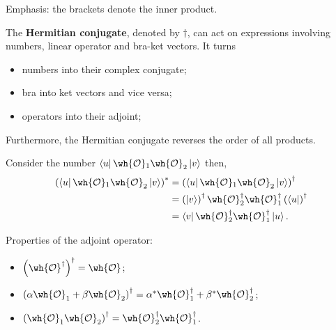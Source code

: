 \documentclass[12pt, a4paper]{article}
\begin{document}
\begin{mdnote}
    Emphasis: the brackets denote the inner product.
\end{mdnote}

\begin{mdthm}
    The \textbf{Hermitian conjugate}, denoted by \(\dagger\), can act on expressions involving numbers, linear operator and bra-ket vectors. It turns 
    \begin{itemize}
        \item numbers into their complex conjugate;
        \item bra into ket vectors and vice versa;
        \item operators into their adjoint;
    \end{itemize}
    Furthermore, the Hermitian conjugate reverses the order of all products.
\end{mdthm}

\begin{mdexample}
    Consider the number \(\bra{u} \wh{\mathcal{O}}_1 \wh{\mathcal{O}}_2 \ket{v}\) then,
    \[\begin{aligned}
        \left( \bra{u} \wh{\mathcal{O}}_1 \wh{\mathcal{O}}_2 \ket{v} \right)^* &= \left( \bra{u} \wh{\mathcal{O}}_1 \wh{\mathcal{O}}_2 \ket{v} \right)^{\dagger} \\
        &= \left( \ket{v} \right)^{\dagger} \wh{\mathcal{O}}_2^{\dagger} \wh{\mathcal{O}}_1^{\dagger} \left( \bra{u} \right)^{\dagger} \\
        &= \bra{v} \wh{\mathcal{O}}_2^{\dagger} \wh{\mathcal{O}}_1^{\dagger} \ket{u}.
    \end{aligned}\]
\end{mdexample}

\begin{mdprop}
    Properties of the adjoint operator:
    \begin{itemize}
        \item \(\left( {\wh{\mathcal{O}}}^{\dagger} \right)^{\dagger} = \wh{\mathcal{O}}\);
        \item \(\left( \alpha\wh{\mathcal{O}}_1 +\beta \wh{\mathcal{O}}_2  \right)^{\dagger} = \alpha^* \wh{\mathcal{O}}_1^{\dagger} + \beta^* \wh{\mathcal{O}}_2^{\dagger}\);
        \item \(\left( \wh{\mathcal{O}}_1 \wh{\mathcal{O}}_2 \right)^{\dagger} = \wh{\mathcal{O}}_2^{\dagger} \wh{\mathcal{O}}_1^{\dagger}\).
    \end{itemize}
\end{mdprop}
\end{document}
